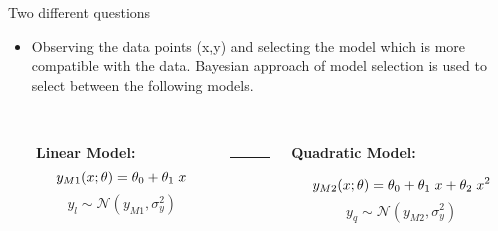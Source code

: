 \documentclass[t, aspectratio=169]{beamer}
\begin{document}
\begin{frame}{Two different questions}
\begin{itemize}
    \item Observing the data points (x,y) and selecting the model which is more compatible with the data. Bayesian approach of model selection is used to select between the following models.
\end{itemize}

\begin{columns}[onlytextwidth]\

\begin{column}{0.45\textwidth}\\
\vspace{0.8cm}
\textbf{Linear Model:}\\
\vspace{0.6cm}
\[y_{M1}(x;\mathbf{\theta}) = \theta_0 + \theta_1 \hspace{0.1cm} x \]
\vspace{0.6cm}
\[y_l \sim \mathcal{N}(y_{M1}, \sigma^2_y)\]

\end{column}

\begin{column}{0.05\textwidth}\\
\Large{}
    \rule[-215pt]{1pt}{200pt}
\end{column}




  \begin{column}{0.5\textwidth}\\
\vspace{0.8cm}
\textbf{Quadratic Model:}\\
\vspace{0.6cm}

\[y_{M2}(x;\mathbf{\theta}) = \theta_0 + \theta_1 \hspace{0.1cm} x  + \theta_2 \hspace{0.1cm} x^2 \]
\vspace{0.6cm}
\[y_q \sim \mathcal{N}(y_{M2}, \sigma^2_y)\]

\end{column}
   
 \end{columns}
 \end{frame} 


\end{document}
